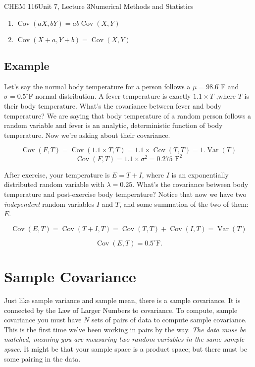 \documentclass{article}
\DeclareMathOperator{\Var}{Var}
\DeclareMathOperator{\Cov}{Cov}
\begin{document}
\begin{tdoc}{CHEM 116}{Unit 7, Lecture 3}{Numerical Methods and Statistics}
\begin{enumerate}
\item $\Cov(aX, bY) = ab\Cov(X,Y)$\\

\item $\Cov(X + a, Y + b) = \Cov(X,Y)$\\

\end{enumerate}

\subsection{Example}

Let's say the normal body temperature for a person follows a $\mu = 98.6 ^{\circ}$F and $\sigma=0.5 ^{\circ}$F normal distribution. A fever temperature is exactly $1.1\times T$ ,where $T$ is their body temperature. What's the covariance between fever and body temperature? We are saying that body temperature of a random person follows a random variable and fever is an analytic, deterministic function of body temperature. Now we're asking about their covariance.

\[
\Cov(F, T) = \Cov(1.1\times T, T) = 1.1\times \Cov(T, T) = 1. \Var(T)
\]
\[
\Cov(F,T) = 1.1\times \sigma^2 = 0.275^\circ \textrm{F}^2
\]

After exercise, your temperature is $E = T + I$, where $I$ is an
exponentially distributed random variable with $\lambda =0.25$. What's the covariance between body temperature and post-exercise body temperature? Notice that now we have two \textit{independent} random variables $I$ and $T$, and some summation of the two of them: $E$.

\[
\Cov(E, T) = \Cov(T + I, T) = \Cov(T, T) + \Cov(I, T) = \Var(T)
\]

\[
\Cov(E, T) = 0.5^\circ \textrm{F}.
\]

\section{Sample Covariance}

Just like sample variance and sample mean, there is a sample
covariance. It is connected by the Law of Larger Numbers to covariance. To compute, sample covariance you must have $N$ sets of pairs of data to compute sample
covariance. This is the first time we've been working in pairs by the
way. \textit{The data muse be matched, meaning you are measuring two random
variables in the same sample space}. It might be that your sample space
is a product space; but there must be some pairing in the data.


\end{tdoc}
\end{document}
